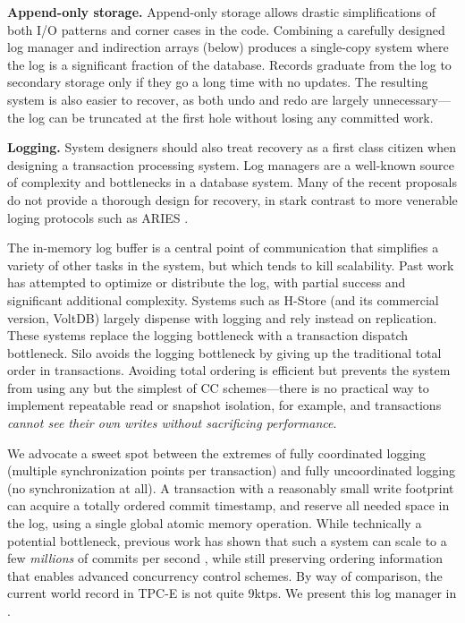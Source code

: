 \vspace{2mm} 
{\bf Append-only storage.}
Append-only storage allows drastic simplifications of both I/O patterns and corner cases in the code. Combining a carefully designed log manager and indirection arrays (below) produces a single-copy system where the log is a significant fraction of the database. Records graduate from the log to secondary storage only if they go a long time with no updates. The resulting system is also easier to recover, as both undo and redo are largely unnecessary---the log can be truncated at the first hole without losing any committed work.

\vspace{2mm} 
{\bf Logging.}
System designers should also treat recovery as a first class citizen when designing a transaction processing system. Log managers are a well-known source of complexity and bottlenecks in a database system. Many of the recent proposals do not provide a thorough design for recovery, in stark contrast to more venerable loging protocols such as ARIES \cite{MohanHLPS92}.

The in-memory log buffer is a central point of communication that simplifies a variety of other tasks in the system, but which tends to kill scalability. Past work has attempted to optimize \cite{JohnsonPSAA10} or distribute \cite{WangJ14} the log, with partial success and significant additional complexity. Systems such as H-Store \cite{Kallman+08} (and its commercial version, VoltDB) largely dispense with logging and rely instead on replication. These systems replace the logging bottleneck with a transaction dispatch bottleneck. Silo avoids the logging bottleneck by giving up the traditional total order in transactions. Avoiding total ordering is efficient but prevents the system from using any but the simplest of CC schemes---there is no practical way to implement repeatable read or snapshot isolation, for example, and transactions {\it cannot see their own writes without sacrificing performance}.

We advocate a sweet spot between the extremes of fully coordinated logging (multiple synchronization points per transaction) and fully uncoordinated logging (no synchronization at all). A transaction with a reasonably small write footprint can acquire a totally ordered commit timestamp, and reserve all needed space in the log, using a single global atomic memory operation. While technically a potential bottleneck, previous work has shown that such a system can scale to a few {\em millions} of commits per second \cite{TuZKLM13}, while still preserving ordering information that enables advanced concurrency control schemes. By way of comparison, the current world record in TPC-E is not quite 9ktps. We present this log manager in .

